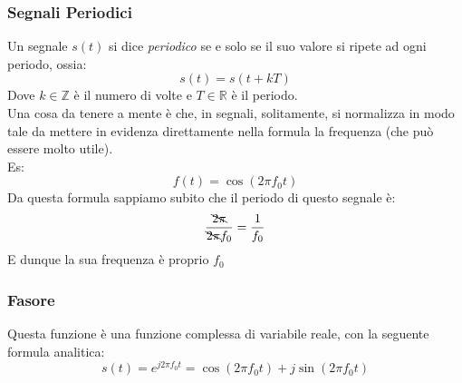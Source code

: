 \subsubsection{Segnali Periodici}
Un segnale $s(t)$ si dice \textit{periodico} se e solo se il suo valore si ripete ad ogni periodo, ossia:
\begin{equation}
    s(t) = s(t + kT)
\end{equation}
Dove $k \in \mathbb{Z}$ è il numero di volte e $T \in \mathbb{R}$ è il periodo.\\
Una cosa da tenere a mente è che, in segnali, solitamente, si normalizza in modo tale da mettere in evidenza
direttamente nella formula la frequenza (che può essere molto utile).\\
Es:
\begin{equation*}
    f(t) = \cos(2\pi f_0 t)
\end{equation*}
Da questa formula sappiamo subito che il periodo di questo segnale è:
\begin{equation*}
    \frac{\bcancel{2\pi}}{\bcancel{2\pi} f_0} = \frac{1}{f_0}
\end{equation*}
E dunque la sua frequenza è proprio $f_0$

\subsubsection{Fasore}
Questa funzione è una funzione complessa di variabile reale, con la seguente formula analitica:
\begin{equation}
    s(t) = e^{j2\pi f_0 t} = \cos(2\pi f_0 t) + j \sin(2\pi f_0 t)
\end{equation} 


